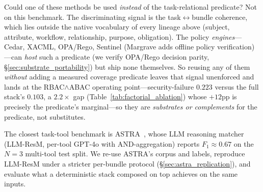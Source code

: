 \documentclass[sigconf,review,anonymous]{acmart}
\begin{document}
Could one of these methods be used \emph{instead} of the task-relational predicate? Not on this benchmark. The discriminating signal is the task$\leftrightarrow$bundle coherence, which lies outside the native vocabulary of every lineage above (subject, attribute, workflow, relationship, purpose, obligation). The policy \emph{engines}---Cedar, XACML, OPA/Rego, Sentinel (Margrave adds offline policy verification)---can \emph{host} such a predicate (we verify OPA/Rego decision parity, \S\ref{sec:substrate_portability}) but ship none themselves. So reusing any of them \emph{without} adding a measured coverage predicate leaves that signal unenforced and lands at the RBAC$\wedge$ABAC operating point---security-failure $0.223$ versus the full stack's $0.103$, a $2.2\times$ gap (Table~\ref{tab:factorial_ablation}) whose $+12$pp is precisely the predicate's marginal---so they are \emph{substrates or complements} for the predicate, not substitutes.

The closest task-tool benchmark is ASTRA~\cite{elhelou2025astra}, whose LLM reasoning matcher (LLM-ResM, per-tool GPT-4o with AND-aggregation) reports $F_1\!\approx\!0.67$ on the $N\!=\!3$ multi-tool test split. We re-use ASTRA's corpus and labels, reproduce LLM-ResM under a stricter per-bundle protocol (\S\ref{sec:astra_replication}), and evaluate what a deterministic stack composed on top achieves on the same inputs.
\end{document}
